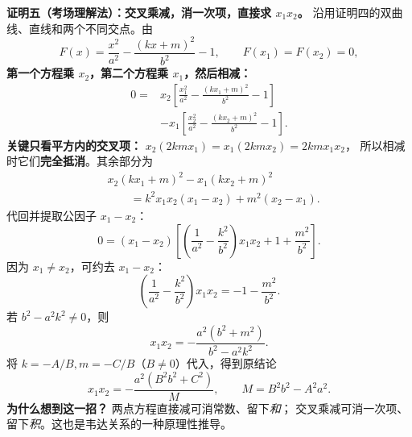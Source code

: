\begin{proofbox}
\textbf{证明五（考场理解法）：交叉乘减，消一次项，直接求 $x_1x_2$。}
沿用证明四的双曲线、直线和两个不同交点。由
\[
 F(x)=\frac{x^2}{a^2}-\frac{(kx+m)^2}{b^2}-1,
 \qquad F(x_1)=F(x_2)=0,
\]
\textbf{第一个方程乘 $x_2$，第二个方程乘 $x_1$，然后相减：}
\[
 \begin{aligned}
 0={}&x_2\left[\frac{x_1^2}{a^2}-\frac{(kx_1+m)^2}{b^2}-1\right]\\
 &-x_1\left[\frac{x_2^2}{a^2}-\frac{(kx_2+m)^2}{b^2}-1\right].
 \end{aligned}
\]
\textbf{关键只看平方内的交叉项：}
$x_2(2kmx_1)=x_1(2kmx_2)=2kmx_1x_2$，
所以相减时它们\textbf{完全抵消}。其余部分为
\[
 \begin{aligned}
 &x_2(kx_1+m)^2-x_1(kx_2+m)^2\\
 &\qquad=k^2x_1x_2(x_1-x_2)+m^2(x_2-x_1).
 \end{aligned}
\]
代回并提取公因子 $x_1-x_2$：
\[
 0=(x_1-x_2)\left[
 \left(\frac1{a^2}-\frac{k^2}{b^2}\right)x_1x_2
 +1+\frac{m^2}{b^2}\right].
\]
因为 $x_1\ne x_2$，可约去 $x_1-x_2$：
\[
 \boxed{\left(\frac1{a^2}-\frac{k^2}{b^2}\right)x_1x_2
 =-1-\frac{m^2}{b^2}}.
\]
若 $b^2-a^2k^2\ne0$，则
\[
 \boxed{x_1x_2=-\frac{a^2(b^2+m^2)}{b^2-a^2k^2}}.
\]
将 $k=-A/B,m=-C/B$（$B\ne0$）代入，得到原结论
\[
 \boxed{x_1x_2=-\frac{a^2(B^2b^2+C^2)}{M}},\qquad
 M=B^2b^2-A^2a^2.
\]
\textbf{为什么想到这一招？} 两点方程直接减可消常数、留下\emph{和}；
交叉乘减可消一次项、留下\emph{积}。这也是韦达关系的一种原理性推导。
\end{proofbox}
\clearpage

